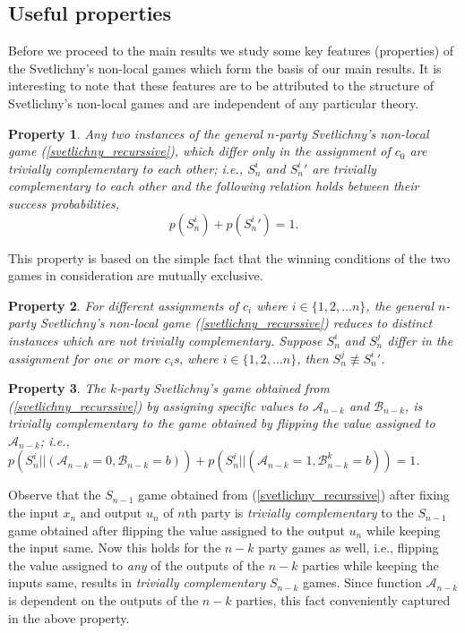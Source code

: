 \documentclass[%
 reprint,
 amsmath,amssymb,
 aps,
]{revtex4-1}
\theoremstyle{plain}
\newtheorem{property}{Property}
\begin{document}
\subsection{Useful properties}
\noindent Before we proceed to the main results we study some key features (properties) of the Svetlichny's non-local games which form the basis of our main results. It is interesting to note that these features are to be attributed to the structure of Svetlichny's non-local games and are independent of any particular theory.\\
\begin{property}
\label{trivial_complementary}
Any two instances of the general $n$-party Svetlichny's non-local game (\ref{svetlichny_recurssive}), which differ only in the assignment of $c_0$ are \textit{trivially complementary} to each other; i.e., $S_n^i$ and ${S_n^i}'$ are trivially complementary to each other and the following relation holds between their success probabilities, 
\begin{equation}
p(S_n^i)+p({S_n^i}')=1.
\end{equation}
\end{property}
This property is based on the simple fact that the winning conditions of the two games in consideration are mutually exclusive.
\begin{property}
\label{not_trivial_complementary}
For different assignments of $c_i$ where $i\in\{1,2,\ldots n\}$, the general $n$-party Svetlichny's non-local game (\ref{svetlichny_recurssive}) reduces to distinct instances which are \textit{not} trivially complementary. Suppose $S_n^i$ and $S_n^j$ differ in the assignment for one or more $c_i$s, where $i \in \{1,2,\ldots n\}$, then $ S_n^j \not \equiv {S_n^i}'$. 
\end{property}
\begin{property}
\label{trivially_complementary_recurrence}
The $k$-party Svetlichny's game obtained from (\ref{svetlichny_recurssive}) by assigning specific values to $\mathcal{A}_{n-k}$ and $\mathcal{B}_{n-k}$, is \textit{trivially complementary} to the game obtained by flipping the value assigned to $\mathcal{A}_{n-k}$; i.e., $p({S_{n}^i||(\mathcal{A}_{n-k}=0,\mathcal{B}_{n-k}=b)})+p(S_{n}^i||(\mathcal{A}_{n-k}=1,\mathcal{B}_{n-k}^k=b))=1$.
\end{property}
Observe that the $S_{n-1}$ game obtained from (\ref{svetlichny_recurssive}) after fixing the input $x_n$ and output $u_n$ of $n$th party is \textit{trivially complementary} to the $S_{n-1}$ game obtained after flipping the value assigned to the output $u_n$ while keeping the input same. Now this holds for the $n-k$ party games as well, i.e., flipping the value assigned to \textit{any} of the outputs of the $n-k$ parties while keeping the inputs same, results in \textit{trivially complementary} $S_{n-k}$ games. Since function $\mathcal{A}_{n-k}$ is dependent on the outputs of the $n-k$ parties, this fact conveniently captured in the above property.
\end{document}
